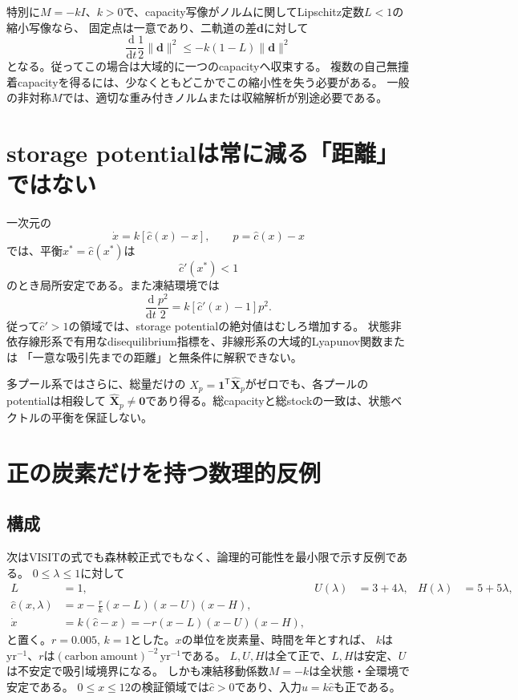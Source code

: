 \documentclass[a4paper,11pt]{ltjsarticle}
\newcommand{\dd}{\mathrm d}
\newcommand{\one}{\bm 1}
\begin{document}
特別に$M=-kI$、$k>0$で、capacity写像がノルムに関してLipschitz定数$L<1$の縮小写像なら、
固定点は一意であり、二軌道の差$\bm d$に対して
\begin{equation}
 \frac{\dd}{\dd t}\frac12\|\bm d\|^2
 \le -k(1-L)\|\bm d\|^2
\end{equation}
となる。従ってこの場合は大域的に一つのcapacityへ収束する。
複数の自己無撞着capacityを得るには、少なくともどこかでこの縮小性を失う必要がある。
一般の非対称$M$では、適切な重み付きノルムまたは収縮解析が別途必要である。

\section{storage potentialは常に減る「距離」ではない}
一次元の
\begin{equation}
 \dot x=k[\widehat c(x)-x],\qquad p=\widehat c(x)-x
 \label{eq:scalar}
\end{equation}
では、平衡$x^*=\widehat c(x^*)$は
\begin{equation}
 \widehat c'(x^*)<1
\end{equation}
のとき局所安定である。また凍結環境では
\begin{equation}
 \frac{\dd}{\dd t}\frac{p^2}{2}
 =k[\widehat c'(x)-1]p^2.
 \label{eq:potentialgrowth}
\end{equation}
従って$\widehat c'>1$の領域では、storage potentialの絶対値はむしろ増加する。
状態非依存線形系で有用なdisequilibrium指標を、非線形系の大域的Lyapunov関数または
「一意な吸引先までの距離」と無条件に解釈できない。

多プール系ではさらに、総量だけの
$X_p=\one^\mathsf T\widehat{\bm X}_p$がゼロでも、各プールのpotentialは相殺して
$\widehat{\bm X}_p\ne\bm0$であり得る。総capacityと総stockの一致は、状態ベクトルの平衡を保証しない。

\section{正の炭素だけを持つ数理的反例}
\subsection{構成}
次はVISITの式でも森林較正式でもなく、論理的可能性を最小限で示す反例である。
$0\le\lambda\le1$に対して
\begin{align}
 L&=1, &U(\lambda)&=3+4\lambda,&H(\lambda)&=5+5\lambda,\\
 \widehat c(x,\lambda)
 &=x-\frac{r}{k}(x-L)(x-U)(x-H),\\
 \dot x&=k(\widehat c-x)
 =-r(x-L)(x-U)(x-H),
 \label{eq:cubic}
\end{align}
と置く。$r=0.005$, $k=1$とした。$x$の単位を炭素量、時間を年とすれば、
$k$は$\mathrm{yr^{-1}}$、$r$は$\mathrm{(carbon\ amount)^{-2}\,yr^{-1}}$である。
$L,U,H$は全て正で、$L,H$は安定、$U$は不安定で吸引域境界になる。
しかも凍結移動係数$M=-k$は全状態・全環境で安定である。
$0\le x\le12$の検証領域では$\widehat c>0$であり、入力$u=k\widehat c$も正である。
\end{document}
